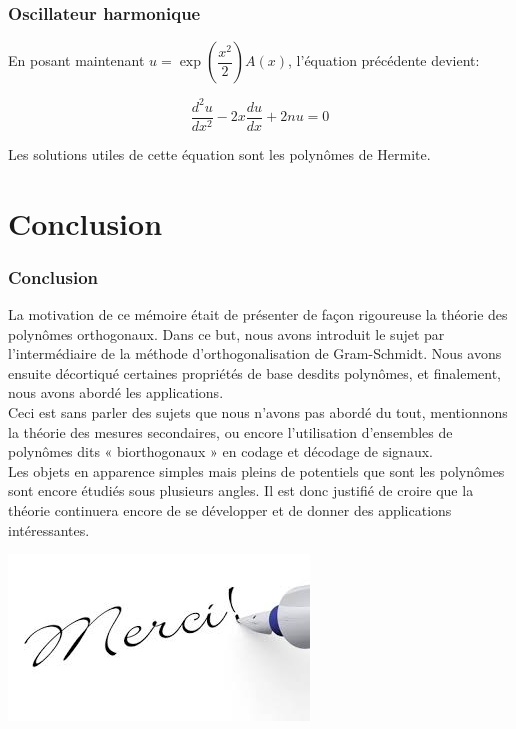 \documentclass[xcolor=dvipsnames,10pt,mathserif]{beamer}
\theoremstyle{plain}
\begin{document}
\begin{frame}\frametitle{Oscillateur harmonique \hfill \insertpagenumber}

En posant maintenant $u=\exp\left(\dfrac{x^2}{2}\right)A(x)$, l'équation précédente devient:
\begin{block}{}
\begin{equation}
\frac{d^2u}{dx^2}-2x\frac{du}{dx}+2nu=0
\end{equation}
\end{block}

\pause

Les solutions utiles de cette équation sont les polynômes de Hermite.
\end{frame}


\section{Conclusion}

\begin{frame} \frametitle{Conclusion}
 
\begin{block}{}
La motivation de ce mémoire était de présenter de façon rigoureuse la théorie des polynômes orthogonaux. Dans ce but, nous avons introduit le sujet par l'intermédiaire de la méthode d'orthogonalisation de Gram-Schmidt. Nous avons ensuite décortiqué certaines propriétés de base desdits polynômes, et finalement, nous avons abordé les applications.
\\Ceci est sans parler des sujets que nous n'avons pas abordé du tout, mentionnons la théorie des mesures secondaires, ou encore l'utilisation d'ensembles de polynômes dits « biorthogonaux » en codage et décodage de signaux.
\\Les objets en apparence simples mais pleins de potentiels que sont les polynômes sont encore étudiés sous plusieurs angles. Il est donc justifié de croire que la théorie continuera encore de se développer et de donner des applications intéressantes.
\end{block} 
  
\end{frame}

 
\begin{frame}

 \begin{center}
 \includegraphics[scale=0.60]{m64.jpeg}\\
 \end{center}
\end{frame}

\end{document}
